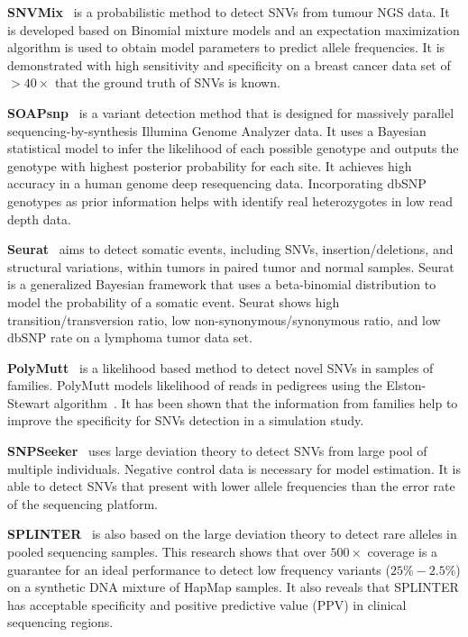\documentclass[a4,center,fleqn]{NAR}
\begin{document}
\textbf{SNVMix}~\citep{Goya2010} is a probabilistic method to detect SNVs from tumour NGS data.
It is developed based on Binomial mixture models and an expectation maximization algorithm is used to obtain model parameters to predict allele frequencies.
It is demonstrated with high sensitivity and specificity on a breast cancer data set of $> 40 \times$ that the ground truth of SNVs is known.

\textbf{SOAPsnp}~\citep{Li2009} is a variant detection method that is designed for massively parallel sequencing-by-synthesis Illumina Genome Analyzer data.
It uses a Bayesian statistical model to infer the likelihood of each possible genotype and outputs the genotype with highest posterior probability for each site.
It achieves high accuracy in a human genome deep resequencing data.
Incorporating dbSNP genotypes as prior information helps with identify real heterozygotes in low read depth data.

\textbf{Seurat}~\citep{Christoforides2013} aims to detect somatic events, including SNVs, insertion/deletions, and structural variations, within tumors in paired tumor and normal samples.
Seurat is a generalized Bayesian framework that uses a beta-binomial distribution to model the probability of a somatic event.
Seurat shows high transition/transversion ratio, low non-synonymous/synonymous ratio, and low dbSNP rate on a lymphoma tumor data set.

\textbf{PolyMutt}~\citep{li2012likelihood} is a likelihood based method to detect novel SNVs in samples of families.
PolyMutt models likelihood of reads in pedigrees using the Elston-Stewart algorithm~\citep{elston1971general}.
It has been shown that the information from families help to improve the specificity for SNVs detection in a simulation study.

\textbf{SNPSeeker}~\citep{Druley2009} uses large deviation theory to detect SNVs from large pool of multiple individuals.
Negative control data is necessary for model estimation.
It is able to detect SNVs that present with lower allele frequencies than the error rate of the sequencing platform.

\textbf{SPLINTER}~\citep{Spencer2014} is also based on the large deviation theory to detect rare alleles in pooled sequencing samples.
This research shows that over $500 \times$ coverage is a guarantee for an ideal performance to detect low frequency variants ($25\% - 2.5\%$) on a synthetic DNA mixture of HapMap samples.
It also reveals that SPLINTER has acceptable specificity and positive predictive value (PPV) in clinical sequencing regions.
\end{document}
